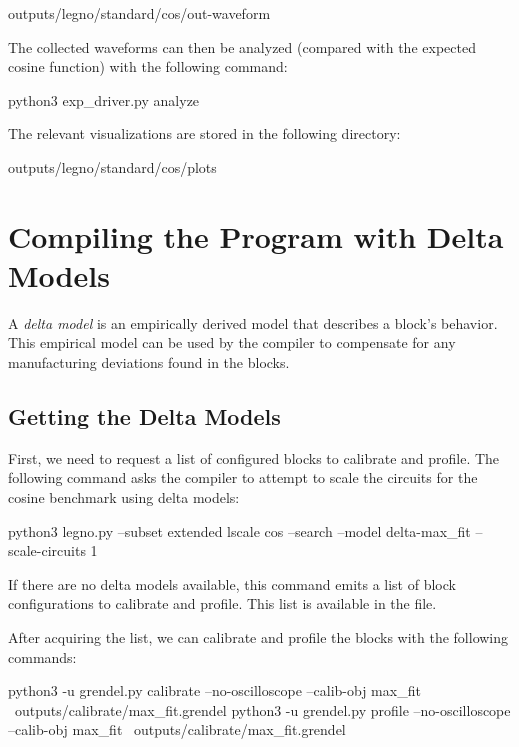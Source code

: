\begin{snippet}
  outputs/legno/standard/cos/out-waveform
\end{snippet}

The collected waveforms can then be analyzed (compared with the expected cosine function) with the following command:

\begin{snippet}
  python3 exp_driver.py analyze
\end{snippet}

The relevant visualizations are stored in the following directory:
\begin{snippet}
  outputs/legno/standard/cos/plots
\end{snippet}

\section{Compiling the  Program with Delta Models}

A \textit{delta model} is an empirically derived model that describes a block's
behavior. This empirical model can be used by the compiler to compensate for any
manufacturing deviations found in the blocks.

\subsection{Getting the Delta Models}

First, we need to request a list of configured blocks to calibrate and profile.
The following command asks the compiler to attempt to scale the circuits for the
cosine benchmark using delta models: 

\begin{snippet}
  python3 legno.py --subset extended lscale cos --search
     --model delta-max_fit --scale-circuits 1
   \end{snippet}

If there are no delta models available, this command emits a list of block
configurations to calibrate and profile. This list is available in the
 file.

After acquiring the list, we can calibrate and profile the blocks with the
following commands:

\begin{snippet}
  python3 -u grendel.py calibrate --no-oscilloscope --calib-obj max_fit \
     outputs/calibrate/max_fit.grendel
  python3 -u grendel.py profile --no-oscilloscope --calib-obj max_fit \
     outputs/calibrate/max_fit.grendel
\end{snippet}

